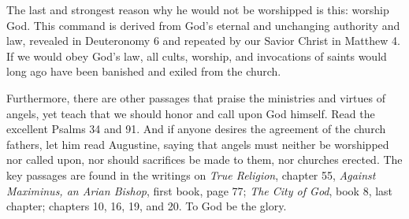 The last and strongest reason why he would not be worshipped is this: worship God. This command is derived from God’s eternal and unchanging authority and law, revealed in Deuteronomy 6 and repeated by our Savior Christ in Matthew 4. If we would obey God’s law, all cults, worship, and invocations of saints would long ago have been banished and exiled from the church.

Furthermore, there are other passages that praise the ministries and virtues of angels, yet teach that we should honor and call upon God himself. Read the excellent Psalms 34 and 91. And if anyone desires the agreement of the church fathers, let him read Augustine, saying that angels must neither be worshipped nor called upon, nor should sacrifices be made to them, nor churches erected. The key passages are found in the writings on \textit{True Religion}, chapter 55, \textit{Against Maximinus, an Arian Bishop}, first book, page 77; \textit{The City of God}, book 8, last chapter; chapters 10, 16, 19, and 20. To God be the glory.
